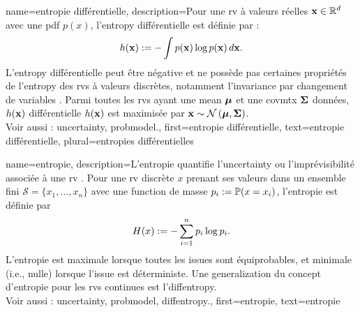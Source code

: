{name={entropie différentielle},
	description={Pour une \gls{rv} à valeurs réelles ${\bf x} \in \mathbb{R}^{d}$ 
		avec une \gls{pdf} $p(x)$, l’\gls{entropy} différentielle est définie par \cite{coverthomas} :
		\[
		h({\bf x}) := - \int p({\bf x}) \log p({\bf x}) \, d{\bf x}.
		\]
		L’\gls{entropy} différentielle peut être négative et ne possède pas certaines propriétés 
		de l’\gls{entropy} des \glspl{rv} à valeurs discrètes, notamment l’invariance par changement de variables \cite{coverthomas}. 
		Parmi toutes les \glspl{rv} ayant une \gls{mean} ${\bm \mu}$ et une \gls{covmtx} ${\bf \Sigma}$ données, 
	$h({\bf x})$ différentielle $h({\bf x})$ est maximisée par ${\bf x} \sim \mathcal{N}\left({\bm \mu},{\bf \Sigma}\right)$. 
		\\
		Voir aussi : \gls{uncertainty}, \gls{probmodel}.},
	first={entropie différentielle},
	text={entropie différentielle}, plural={entropies différentielles}
}

{name={entropie},
	description={L’entropie quantifie l’\gls{uncertainty} ou l’imprévisibilité associée à une \gls{rv} \cite{coverthomas}. 
		Pour une \gls{rv} discrète $x$ prenant ses valeurs dans un ensemble fini $\mathcal{S} = \{x_1, \ldots, x_n\}$ avec 
		une \gls{function} de masse $p_i := \mathbb{P}({x = x_i})$, l’entropie est définie par
		\[
		H(x) := -\sum_{i=1}^n p_i \log p_i.
		\]
		L’entropie est maximale lorsque toutes les issues sont équiprobables, et minimale (i.e., nulle) 
		lorsque l’issue est déterministe. Une \gls{generalization} du concept d’entropie pour les \glspl{rv} continues est l’\gls{diffentropy}. 
		\\
		Voir aussi : \gls{uncertainty}, \gls{probmodel}, \gls{diffentropy}.},
	first={entropie},
	text={entropie}
}



